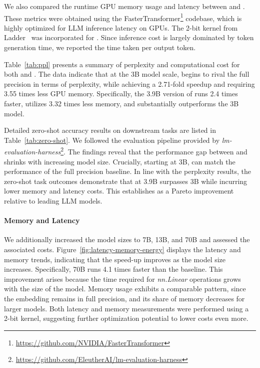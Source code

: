 We also compared the runtime GPU memory usage and latency between  and . These metrics were obtained using the FasterTransformer\footnote{\url{https://github.com/NVIDIA/FasterTransformer}} codebase, which is highly optimized for LLM inference latency on GPUs. The 2-bit kernel from Ladder~\cite{ladder} was incorporated for . Since inference cost is largely dominated by token generation time, we reported the time taken per output token.

Table~\ref{tab:ppl} presents a summary of perplexity and computational cost for both  and . The data indicate that at the 3B model scale,  begins to rival the full precision  in terms of perplexity, while achieving a 2.71-fold speedup and requiring 3.55 times less GPU memory. Specifically, the 3.9B version of  runs 2.4 times faster, utilizes 3.32 times less memory, and substantially outperforms the  3B model.

Detailed zero-shot accuracy results on downstream tasks are listed in Table~\ref{tab:zero-shot}. We followed the evaluation pipeline provided by \emph{lm-evaluation-harness}\footnote{\url{https://github.com/EleutherAI/lm-evaluation-harness}}. The findings reveal that the performance gap between  and  shrinks with increasing model size. Crucially, starting at 3B,  can match the performance of the full precision baseline. In line with the perplexity results, the zero-shot task outcomes demonstrate that  at 3.9B surpasses  3B while incurring lower memory and latency costs. This establishes  as a Pareto improvement relative to leading LLM models.

\paragraph{Memory and Latency}

We additionally increased the model sizes to 7B, 13B, and 70B and assessed the associated costs. Figure~\ref{fig:latency-memory-energy} displays the latency and memory trends, indicating that the speed-up improves as the model size increases. Specifically,  70B runs 4.1 times faster than the  baseline. This improvement arises because the time required for \emph{nn.Linear} operations grows with the size of the model. Memory usage exhibits a comparable pattern, since the embedding remains in full precision, and its share of memory decreases for larger models. Both latency and memory measurements were performed using a 2-bit kernel, suggesting further optimization potential to lower costs even more.

